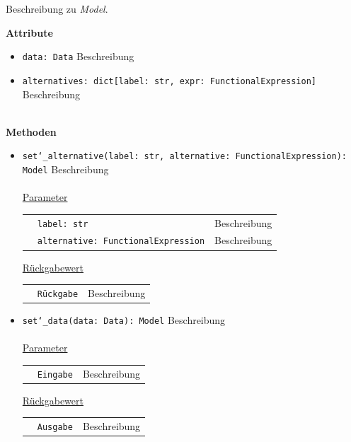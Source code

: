 \documentclass{article}
\begin{document}
Beschreibung zu \textit{Model}.
\newline \newline

\textbf{{Attribute}}
\begin{itemize}
\item \texttt{data: Data} \newline Beschreibung
\item \texttt{alternatives: dict[label: str, expr: FunctionalExpression]} \newline Beschreibung
\\\\
\end{itemize}

\textbf{{Methoden}}
\begin{itemize}
\item \texttt{set\char`_alternative(label: str, alternative: FunctionalExpression): Model} \newline Beschreibung
\\\\
\underline{{Parameter}}

\begin{tabular}{lll}
 & \texttt{label: str} & Beschreibung \\
 & \texttt{alternative: FunctionalExpression} & Beschreibung \\
\end{tabular}

\underline{{Rückgabewert}}

\begin{tabular}{lll}
 & \texttt{Rückgabe} & Beschreibung \\
\end{tabular}

\item \texttt{set\char`_data(data: Data): Model} \newline Beschreibung
\\\\
\underline{{Parameter}}
\begin{tabular}{lll}
 & \texttt{Eingabe} & Beschreibung \\
\end{tabular}

\underline{{Rückgabewert}}
\begin{tabular}{lll}
 & \texttt{Ausgabe} & Beschreibung \\
\end{tabular}
\end{itemize}
\end{document}
